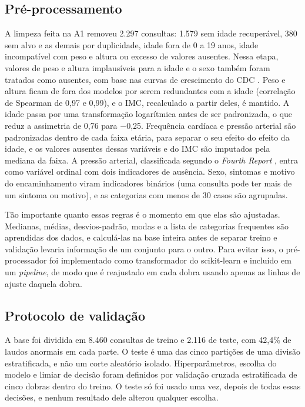 \documentclass[conference]{IEEEtran}
\begin{document}
\subsection{Pré-processamento}
A limpeza feita na A1 removeu 2.297 consultas: 1.579 sem idade recuperável, 380 sem alvo e as demais por duplicidade, idade fora de 0 a 19 anos, idade incompatível com peso e altura ou excesso de valores ausentes. Nessa etapa, valores de peso e altura implausíveis para a idade e o sexo também foram tratados como ausentes, com base nas curvas de crescimento do CDC \cite{cdc}. Peso e altura ficam de fora dos modelos por serem redundantes com a idade (correlação de Spearman de 0,97 e 0,99), e o IMC, recalculado a partir deles, é mantido. A idade passa por uma transformação logarítmica antes de ser padronizada, o que reduz a assimetria de 0,76 para $-$0,25. Frequência cardíaca e pressão arterial são padronizadas dentro de cada faixa etária, para separar o seu efeito do efeito da idade, e os valores ausentes dessas variáveis e do IMC são imputados pela mediana da faixa. A pressão arterial, classificada segundo o \textit{Fourth Report} \cite{fourth}, entra como variável ordinal com dois indicadores de ausência. Sexo, sintomas e motivo do encaminhamento viram indicadores binários (uma consulta pode ter mais de um sintoma ou motivo), e as categorias com menos de 30 casos são agrupadas.

Tão importante quanto essas regras é o momento em que elas são ajustadas. Medianas, médias, desvios-padrão, modas e a lista de categorias frequentes são aprendidas dos dados, e calculá-las na base inteira antes de separar treino e validação levaria informação de um conjunto para o outro. Para evitar isso, o pré-processador foi implementado como transformador do scikit-learn \cite{sklearn} e incluído em um \textit{pipeline}, de modo que é reajustado em cada dobra usando apenas as linhas de ajuste daquela dobra.

\subsection{Protocolo de validação}
A base foi dividida em 8.460 consultas de treino e 2.116 de teste, com 42,4\% de laudos anormais em cada parte. O teste é uma das cinco partições de uma divisão estratificada, e não um corte aleatório isolado. Hiperparâmetros, escolha do modelo e limiar de decisão foram definidos por validação cruzada estratificada de cinco dobras dentro do treino. O teste só foi usado uma vez, depois de todas essas decisões, e nenhum resultado dele alterou qualquer escolha.
\end{document}
